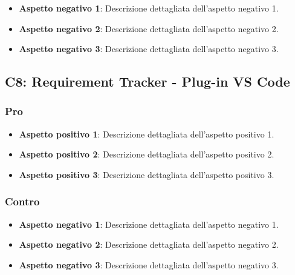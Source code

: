 \begin{itemize}
    \item \textbf{Aspetto negativo 1}: Descrizione dettagliata dell'aspetto negativo 1.
    \item \textbf{Aspetto negativo 2}: Descrizione dettagliata dell'aspetto negativo 2.
    \item \textbf{Aspetto negativo 3}: Descrizione dettagliata dell'aspetto negativo 3.
\end{itemize}


\subsection{C8: Requirement Tracker - Plug-in VS Code}

\subsubsection{Pro}

\begin{itemize}
    \item \textbf{Aspetto positivo 1}: Descrizione dettagliata dell'aspetto positivo 1.
    \item \textbf{Aspetto positivo 2}: Descrizione dettagliata dell'aspetto positivo 2.
    \item \textbf{Aspetto positivo 3}: Descrizione dettagliata dell'aspetto positivo 3.
\end{itemize}

\subsubsection{Contro}

\begin{itemize}
    \item \textbf{Aspetto negativo 1}: Descrizione dettagliata dell'aspetto negativo 1.
    \item \textbf{Aspetto negativo 2}: Descrizione dettagliata dell'aspetto negativo 2.
    \item \textbf{Aspetto negativo 3}: Descrizione dettagliata dell'aspetto negativo 3.
\end{itemize}